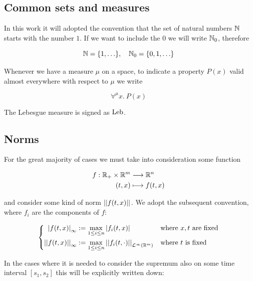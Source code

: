 \label{app:notation}

\subsection{Common sets and measures}

In this work it will adopted the convention that the set of natural numbers $\N$ starts with the number $1$.
If we want to include the $0$ we will write $\N_0$, therefore

\begin{equation*}
	\N = \{1, \ldots\}, 
	\quad
	\N_0 = \{0,1,\ldots\}
\end{equation*}

Whenever we have a measure $\mu$ on a space, to indicate a property $P(x)$ valid almost everywhere with respect to $\mu$ we write 

\begin{equation*}
	\forall^{\mu}x.\
		P(x)
\end{equation*}

The Lebesgue measure is signed as $\lebsge$.

\subsection{Norms}

For the great majority of cases we must take into consideration some function

\begin{align*}
	f: \R_+ \times \R^m 	&\longrightarrow		\R^n
	\\
	(t, x) 						&\longmapsto				f(t,x)
\end{align*}

and consider some kind of norm $\Normp{}{f(t,x)}$.
We adopt the subsequent convention, where $f_i$ are the components of $f$:

\begin{equation*}
	\left\{
	\begin{aligned}
		\normp{\infty}{f(t,x)} &:= \max_{1 \leq i \leq n} \normp{}{f_i(t,x)}		&& \text{where $x,t$ are fixed}
		\\
		\Normp{\infty}{f(t,x)} &:=  \max_{1 \leq i \leq n} \Normp{\Lpspace^\infty(\R^m)}{f_i(t,\cdot)}			&& \text{where $t$ is fixed}
	\end{aligned}
	\right.
\end{equation*}

In the cases where it is needed to consider the supremum also on some time interval $[s_1,s_2]$ this will be explicitly written down:

